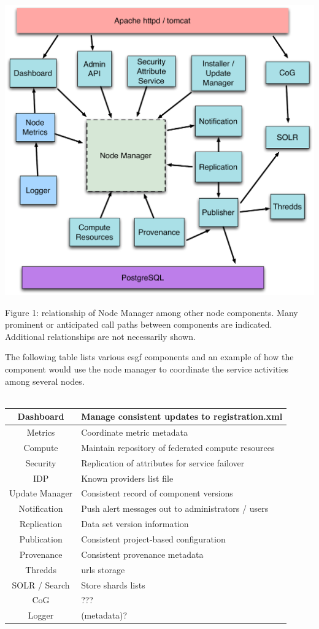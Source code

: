 \documentclass[oneside,12pt]{memoir}
\begin{document}
\begin{center}
\includegraphics[width=\textwidth]{presentation/ESGF-node-components.pdf}

Figure 1:  relationship of Node Manager among other node components.  Many prominent or anticipated call paths between components are indicated.  Additional relationships are not necessarily shown.  
\end{center}


The following table lists various esgf components and an example of how the component would use the node manager to coordinate the service activities among several nodes.  \\
\\

\begin{tabular}{|c|l|}
\hline
Dashboard &  Manage consistent updates to registration.xml \\
\hline
Metrics & Coordinate metric metadata \\
\hline
Compute & Maintain repository of federated compute resources \\
\hline
Security & Replication of attributes for service failover \\
\hline
 IDP & Known providers list file \\
\hline
Update Manager & Consistent record of component versions \\
\hline
Notification & Push alert messages out to administrators / users \\
\hline
Replication & Data set version information \\
\hline
Publication & Consistent project-based configuration \\
\hline
Provenance & Consistent provenance metadata \\
\hline
Thredds & urls storage \\
\hline
SOLR / Search & Store shards lists \\
\hline
CoG & ??? \\
\hline
Logger & (metadata)? \\
\hline
\end{tabular}
\end{document}
